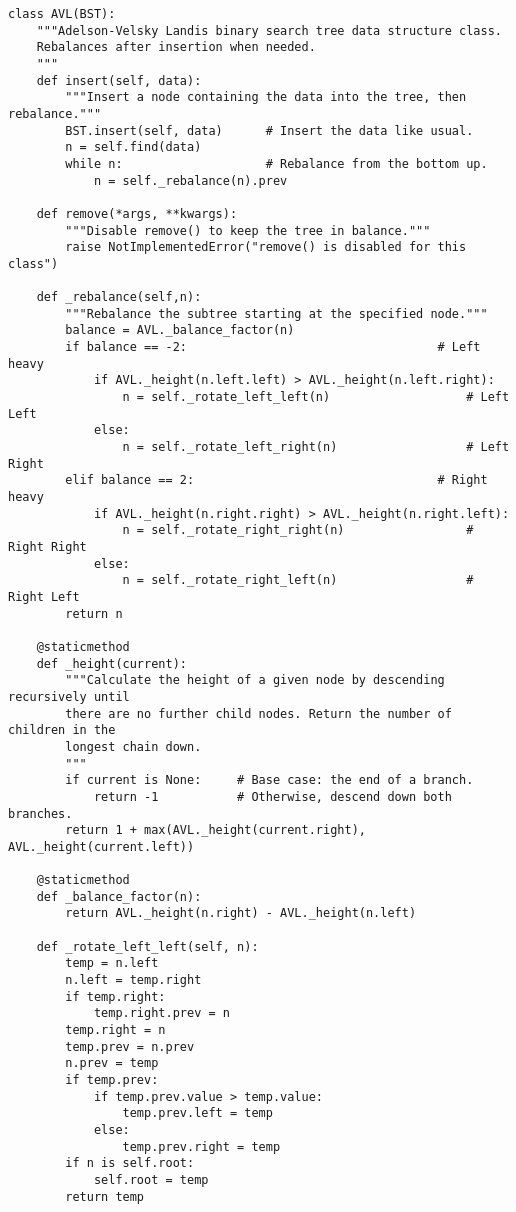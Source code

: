 \begin{lstlisting}
class AVL(BST):
    """Adelson-Velsky Landis binary search tree data structure class.
    Rebalances after insertion when needed.
    """
    def insert(self, data):
        """Insert a node containing the data into the tree, then rebalance."""
        BST.insert(self, data)      # Insert the data like usual.
        n = self.find(data)
        while n:                    # Rebalance from the bottom up.
            n = self._rebalance(n).prev

    def remove(*args, **kwargs):
        """Disable remove() to keep the tree in balance."""
        raise NotImplementedError("remove() is disabled for this class")

    def _rebalance(self,n):
        """Rebalance the subtree starting at the specified node."""
        balance = AVL._balance_factor(n)
        if balance == -2:                                   # Left heavy
            if AVL._height(n.left.left) > AVL._height(n.left.right):
                n = self._rotate_left_left(n)                   # Left Left
            else:
                n = self._rotate_left_right(n)                  # Left Right
        elif balance == 2:                                  # Right heavy
            if AVL._height(n.right.right) > AVL._height(n.right.left):
                n = self._rotate_right_right(n)                 # Right Right
            else:
                n = self._rotate_right_left(n)                  # Right Left
        return n

    @staticmethod
    def _height(current):
        """Calculate the height of a given node by descending recursively until
        there are no further child nodes. Return the number of children in the
        longest chain down.
        """
        if current is None:     # Base case: the end of a branch.
            return -1           # Otherwise, descend down both branches.
        return 1 + max(AVL._height(current.right), AVL._height(current.left))

    @staticmethod
    def _balance_factor(n):
        return AVL._height(n.right) - AVL._height(n.left)

    def _rotate_left_left(self, n):
        temp = n.left
        n.left = temp.right
        if temp.right:
            temp.right.prev = n
        temp.right = n
        temp.prev = n.prev
        n.prev = temp
        if temp.prev:
            if temp.prev.value > temp.value:
                temp.prev.left = temp
            else:
                temp.prev.right = temp
        if n is self.root:
            self.root = temp
        return temp


\end{lstlisting}
